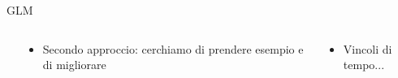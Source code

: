 \begin{frame}{GLM}
\begin{columns}
\begin{column}{0.15\textwidth}
        \end{column}
        \begin{column}{0.40\textwidth}
            \begin{itemize}
                \item Secondo approccio: cerchiamo di prendere esempio e di migliorare
            \end{itemize}
        \end{column}
        \begin{column}{0.20\textwidth}
            \begin{itemize}
                \item Vincoli di tempo...
            \end{itemize}
        \end{column}
    \end{columns}
\end{frame}
